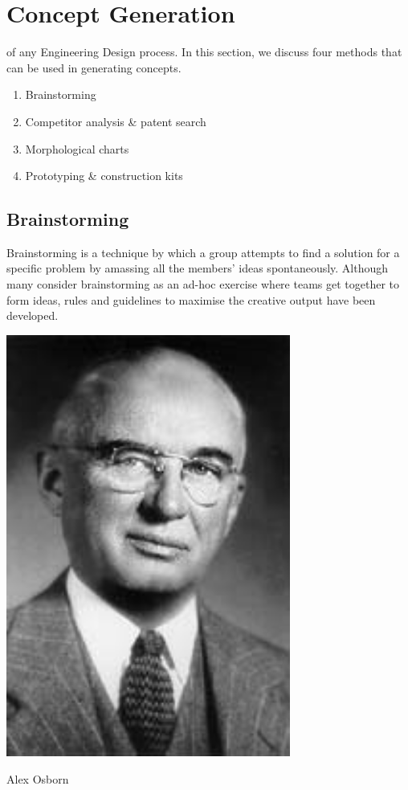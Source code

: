 \section{Concept Generation}\label{sec-concept-generation}

 of any Engineering Design process. In this section, we discuss four methods that can be used in generating concepts.

\begin{enumerate}
\item Brainstorming
\item Competitor analysis \& patent search
\item Morphological charts
\item Prototyping \& construction kits
\end{enumerate}

\subsection{Brainstorming}

Brainstorming is a technique by which a group attempts to find a solution for a specific problem by amassing all the members' ideas spontaneously. Although many consider brainstorming as an ad-hoc exercise where teams get together to form ideas, rules and guidelines to maximise the creative output have been developed.

\begin{marginfigure}
  \centering
  \includegraphics[width=0.7\textwidth]{figs/osborn.jpg}
  \caption[Alex Osborn]{Alex Osborn}
  \label{fig-osborn}
\end{marginfigure}



